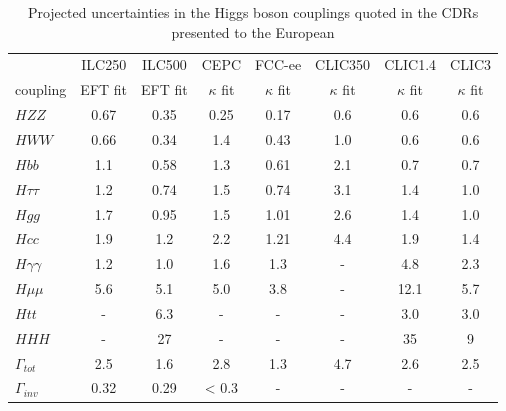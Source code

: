 \begin{table}[!htbp]
\begin{center}
\begin{tabular}{l|cc|c|c|ccc}
    &  ILC250      &   ILC500   & CEPC &  FCC-ee &
   CLIC350 & 
   CLIC1.4 & CLIC3 \\ 
coupling &   EFT fit & EFT fit & $\kappa$ fit &  $\kappa$ fit &
                                                                $\kappa$
                                                                fit &
                                                                      $\kappa$
                                                                      fit
  &  $\kappa$ fit \\ \hline 
$HZZ$            &             0.67&   0.35    &   0.25   & 0.17     &  0.6     &     0.6    &   0.6     \\ 
$HWW$            &         0.66  &   0.34   &   1.4   &   0.43   &   1.0    &   0.6  &  0.6 \\ 
 $Hbb$            &              1.1  &  0.58   &  1.3    &    0.61  &   2.1    &  0.7  &  0.7 \\ 
$H\tau\tau$    &          1.2  &   0.74   &   1.5   &  0.74    &   3.1    &  1.4  &  1.0 \\ 
$Hgg$ &                      1.7  & 0.95       &  1.5    &  1.01    &   2.6    &   1.4   &  1.0  \\ 
$Hcc$                       &   1.9  &  1.2   &   2.2   &   1.21   &    4.4   &  1.9  &  1.4 \\ 
$H\gamma\gamma$ &  1.2 &   1.0     &  1.6    &   1.3   &    -   &  4.8  &  2.3 \\ 
$H\mu\mu$                &  5.6  &  5.1     &  5.0    &  3.8    &    -
& 12.1 &  5.7 \\ 
$Htt$  &                       -     &      6.3     &  -    &  -    &
-    & 3.0  &  3.0  \\ 
$HHH$                         &  -    &   27     &   -   &   -   &   -
& 35 &  9 \\ \hline 
$\Gamma_{tot}$             & 2.5  & 1.6    &   2.8    &  1.3     &
4.7    & 2.6  & 2.5 \\  
$\Gamma_{inv}$          &   0.32  & 0.29    &  < 0.3    &   -   &   -
& -  & - \\  \hline
\end{tabular}
\end{center}
\caption{ \label{tab:askthem}    Projected uncertainties in the Higgs
  boson couplings quoted in the CDRs presented to the European
}
\end{table}
